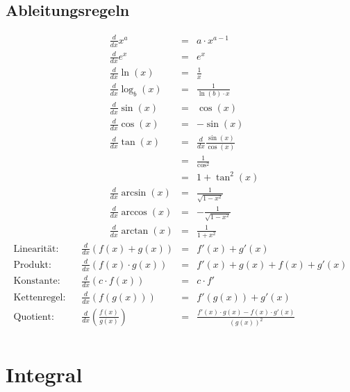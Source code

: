 \documentclass[../Main.tex]{subfiles}
\begin{document}
\subsection{Ableitungsregeln}
\begin{equation}
    \begin{aligned}
        &\frac{d}{dx}x^a         &= &a \cdot x^{a-1} \\
        &\frac{d}{dx}e^x         &= &e^x \\
        &\frac{d}{dx}\ln(x)      &= &\frac{1}{x} \\
        &\frac{d}{dx}\log_b(x)   &= &\frac{1}{\ln(b) \cdot x} \\
        &\frac{d}{dx}\sin(x)     &= &\cos(x) \\
        &\frac{d}{dx}\cos(x)     &= &-\sin(x) \\
        &\frac{d}{dx}\tan(x)     &= &\frac{d}{dx}\frac{\sin(x)}{\cos(x)}  \\
         &&= &\frac{1}{\cos^2} \\
         &&= &1 + \tan^2(x) \\
        &\frac{d}{dx}\arcsin(x)  &= &\frac{1}{\sqrt{1-x^2}} \\
        &\frac{d}{dx}\arccos(x)  &= &-\frac{1}{\sqrt{1-x^2}} \\
        &\frac{d}{dx}\arctan(x)  &= &\frac{1}{1+x^2}
    \end{aligned}
\end{equation}
\begin{equation}
    \begin{aligned}
        \text{Linearität: }    \enspace    &\frac{d}{dx} (f(x)+g(x))           &= &f'(x)+g'(x) \\
        \text{Produkt: }       \enspace    &\frac{d}{dx} (f(x) \cdot g(x))     &= &f'(x)+g(x) + f(x)+g'(x) \\
        \text{Konstante: }     \enspace    &\frac{d}{dx} (c \cdot f(x))        &= &c \cdot f' \\
        \text{Kettenregel: }   \enspace    &\frac{d}{dx} (f(g(x)))             &= &f'(g(x))+g'(x) \\
        \text{Quotient: }      \enspace    &\frac{d}{dx} (\frac{f(x)}{g(x)})   &= &\frac{f'(x) \cdot g(x) - f(x) \cdot g'(x)}{(g(x))^2} \\
    \end{aligned}
\end{equation}

\section{Integral}
\end{document}
